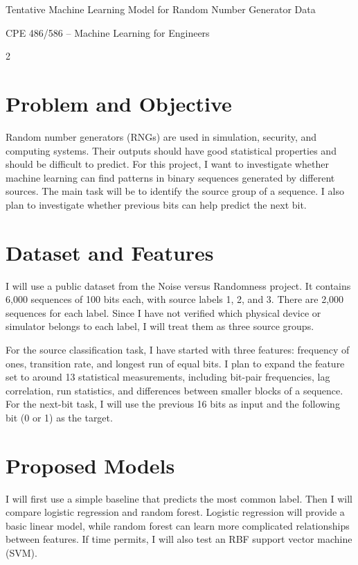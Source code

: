 \documentclass[11pt,letterpaper]{article}
\begin{document}
\begin{center}
{\fontsize{14}{16}\selectfont Tentative Machine Learning Model for Random Number Generator Data}\par
\vspace{3pt}
{\normalsize CPE 486/586 -- Machine Learning for Engineers}\par
\vspace{8pt}
\end{center}
\begin{multicols}{2}

\section{Problem and Objective}
Random number generators (RNGs) are used in simulation, security, and computing systems. Their outputs should have good statistical properties and should be difficult to predict. For this project, I want to investigate whether machine learning can find patterns in binary sequences generated by different sources. The main task will be to identify the source group of a sequence. I also plan to investigate whether previous bits can help predict the next bit.

\section{Dataset and Features}
I will use a public dataset from the Noise versus Randomness project. It contains 6,000 sequences of 100 bits each, with source labels 1, 2, and 3. There are 2,000 sequences for each label. Since I have not verified which physical device or simulator belongs to each label, I will treat them as three source groups.

For the source classification task, I have started with three features: frequency of ones, transition rate, and longest run of equal bits. I plan to expand the feature set to around 13 statistical measurements, including bit-pair frequencies, lag correlation, run statistics, and differences between smaller blocks of a sequence. For the next-bit task, I will use the previous 16 bits as input and the following bit (0 or 1) as the target.

\section{Proposed Models}
I will first use a simple baseline that predicts the most common label. Then I will compare logistic regression and random forest. Logistic regression will provide a basic linear model, while random forest can learn more complicated relationships between features. If time permits, I will also test an RBF support vector machine (SVM).


\end{multicols}
\end{document}
